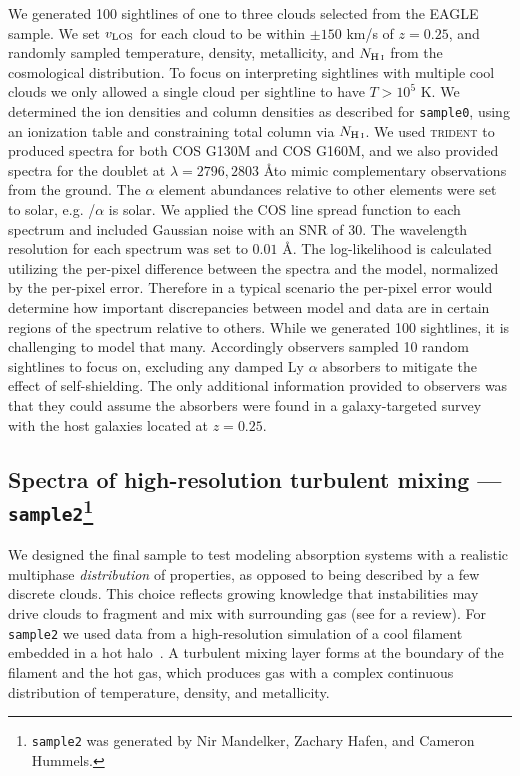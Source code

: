 \documentclass[fleqn,usenatbib]{mnras}
\begin{document}
We generated 100 sightlines of one to three clouds selected from the EAGLE sample.
We set $v_{\rm LOS}$ for each cloud to be within $\pm150$ km/s of $z=0.25$, and randomly sampled temperature, density, metallicity, and $N_{\ion{H}{I}}$ from the cosmological distribution.
To focus on interpreting sightlines with multiple cool clouds we only allowed a single cloud per sightline to have $T>10^5$ K.
We determined the ion densities and column densities as described for \texttt{sample0}, using an ionization table and constraining total column via $N_{\ion{H}{I}}$.
We used \textsc{trident} to produced spectra for both COS G130M and COS G160M, and we also provided spectra for the  doublet at $\lambda = 2796, 2803$ \AA to mimic complementary observations from the ground.
The $\alpha$ element abundances relative to other elements were set to solar, e.g. /$\alpha$ is solar.
We applied the COS line spread function to each spectrum and included Gaussian noise with an SNR of 30.
The wavelength resolution for each spectrum was set to $0.01$ \AA.
The log-likelihood is calculated utilizing the per-pixel difference between the spectra and the model, normalized by the per-pixel error.
Therefore in a typical scenario the per-pixel error would determine how important discrepancies between model and data are in certain regions of the spectrum relative to others.
While we generated 100 sightlines, it is challenging to model that many.
Accordingly observers sampled 10 random sightlines to focus on, excluding any damped Ly $\alpha$ absorbers to mitigate the effect of self-shielding.
The only additional information provided to observers was that they could assume the absorbers were found in a galaxy-targeted survey with the host galaxies located at $z=0.25$.

\subsection[Spectra of high-resolution turbulent mixing --- \texttt{sample2}]{Spectra of high-resolution turbulent mixing --- \texttt{sample2}\footnote{
\texttt{sample2} was generated by Nir Mandelker, Zachary Hafen, and Cameron Hummels.}}
\label{s: data generation -- sample2}

We designed the final sample to test modeling absorption systems with a realistic multiphase \textit{distribution} of properties, as opposed to being described by a few discrete clouds.
This choice reflects growing knowledge that instabilities may drive clouds to fragment and mix with surrounding gas (see \citealt{faucher-giguere2023Key} for a review).
For \texttt{sample2} we used data from a high-resolution simulation of a cool filament embedded in a hot halo~\citep{mandelker2020Instability}.
A turbulent mixing layer forms at the boundary of the filament and the hot gas, which produces gas with a complex continuous distribution of temperature, density, and metallicity.
\end{document}
